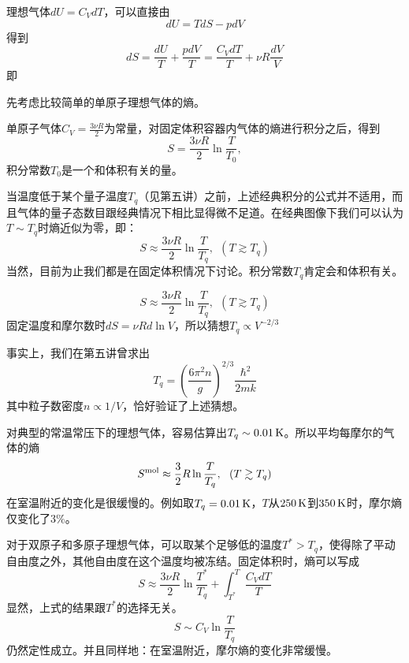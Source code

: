 \documentclass[CJK]{beamer}
\begin{document}
\begin{frame}
  \bch
  理想气体$dU = C_V dT$，可以直接由
  $$ dU = TdS - pdV$$
  得到
  $$ dS = \frac{dU}{T} + \frac{pdV}{T} = \frac{C_VdT}{T} + \nu R\frac{dV}{V}$$
  即
  \ech
\end{frame}

\begin{frame}
  \bch
  先考虑比较简单的单原子理想气体的熵。

  
  单原子气体$C_V=\frac{3\nu R}{2}$为常量，对固定体积容器内气体的熵进行积分之后，得到
  $$ S  = \frac{3\nu R}{2} \ln\frac{T}{T_0}, $$
  积分常数$T_0$是一个和体积有关的量。
  
  当温度低于某个量子温度$T_q$（见第五讲）之前，上述经典积分的公式并不适用，而且气体的量子态数目跟经典情况下相比显得微不足道。在经典图像下我们可以认为$T\sim T_q$时熵近似为零，即：
  $$S \approx \frac{3\nu R}{2} \ln\frac{T}{T_q},\ \ (T\gtrsim T_q)$$
  当然，目前为止我们都是在固定体积情况下讨论。积分常数$T_q$肯定会和体积有关。
   
  \ech
\end{frame}

\begin{frame}
  \bch
  $$S \approx \frac{3\nu R}{2} \ln\frac{T}{T_q},\ \ (T\gtrsim T_q)$$  
  固定温度和摩尔数时$dS = \nu R d\ln V$，所以猜想$T_q \propto V^{-2/3}$

  事实上，我们在第五讲曾求出
  $$T_q = \left(\frac{6\pi^2 n}{ g}\right)^{2/3} \frac{\hbar^2}{2mk}$$
  其中粒子数密度$n\propto 1/V$，恰好验证了上述猜想。

  对典型的常温常压下的理想气体，容易估算出$T_q\sim 0.01\,\mathrm{K}$。所以平均每摩尔的气体的熵
  $$S^{\rm mol} \approx \frac{3}{2}R\ln\frac{T}{T_q},\ \ (T\gtrsim T_q)$$
  在室温附近的变化是很缓慢的。例如取$T_q = 0.01\,\mathrm{K}$，$T$从$250\,\mathrm{K}$到$350\,\mathrm{K}$时，摩尔熵仅变化了$3\%$。
  \ech
\end{frame}


\begin{frame}
  \bch
  对于双原子和多原子理想气体，可以取某个足够低的温度$T^*> T_q$，使得除了平动自由度之外，其他自由度在这个温度均被冻结。固定体积时，熵可以写成
  $$S \approx \frac{3\nu R}{2} \ln\frac{T^*}{T_q} + \int_{T^*}^T \frac{C_VdT}{T}$$
  显然，上式的结果跟$T^*$的选择无关。
  $$ S \sim C_V\ln\frac{T}{T_q}$$
  仍然定性成立。并且同样地：{\blue 在室温附近，摩尔熵的变化非常缓慢}。
  \ech
\end{frame}
\end{document}
